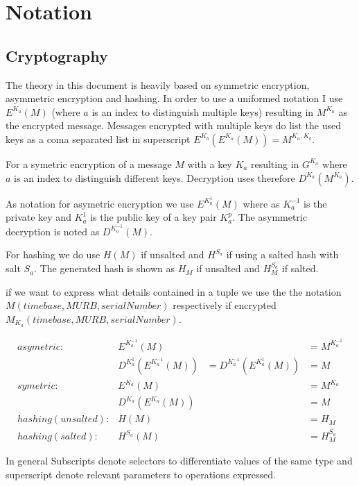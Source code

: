 \section{Notation}
\subsection{Cryptography}
The theory in this document is heavily based on symmetric encryption, asymmetric encryption and hashing. In order to use a uniformed notation I use $E^{K_a}(M)$ (where $a$ is an index to distinguish multiple keys) resulting in $M^{K_a}$ as the encrypted message. Messages encrypted with multiple keys do list the used keys as a coma separated list in superscript $E^{K_b}\left(E^{K_a}\left(M\right)\right)=M^{{K_{a}},{K_b}}$.

For a symetric encryption of a message $M$ with a key $K_a$ resulting in $G^{K_a}$ where $a$ is an index to distinguish different keys. Decryption uses therefore $D^{K_a}(M^{K_a})$.

As notation for asymetric encryption we use $E^{K^{1}_a}(M)$ where as $K^{-1}_a$ is the private key and $K^{1}_a$ is the public key of a key pair $K^p_a$. The asymmetric decryption is noted as $D^{K^{-1}_a}(M)$.

For hashing we do use $H(M)$ if unsalted and $H^{S_a}$ if using a salted hash with salt $S_a$. The generated hash is shown as $H_M$ if unsalted and $H^{S_a}_M$ if salted.

if we want to express what details contained in a tuple we use the the notation $M(timebase,MURB,serialNumber)$ respectively if encrypted $M_{K_{a}}(timebase,MURB,serialNumber)$.

\begin{align*}
asymetric: & E^{K^{-1}_a}\left(M\right) &~&=M^{K^{-1}_a}\\
& D^{K^{1}_a}\left(E^{K^{-1}_a}\left(M\right)\right)&=D^{K^{-1}_a}\left(E^{K^{1}_a}\left(M\right)\right)&=M\\
symetric:  & E^{K_a}\left(M\right) &~&=M^{K_a}\\
& D^{K_a}\left(E^{K_a}\left(M\right)\right)&~&=M\\
hashing (unsalted): & H\left(M\right)&~&=H_M\\
hashing (salted): & H^{S_a}\left(M\right)&~&=H^{S_a}_M
\end{align*}

In general Subscripts denote selectors to differentiate values of the same type and superscript denote relevant parameters to operations expressed.

